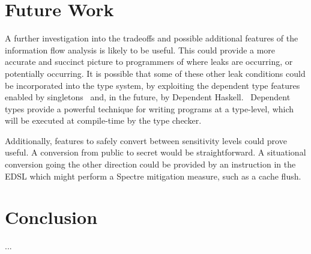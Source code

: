 \documentclass[10pt, conference]{IEEEtran}
\begin{document}

\section{Future Work}
A further investigation into the tradeoffs and possible additional features of
the information flow analysis is likely to be useful. This could provide a more
accurate and succinct picture to programmers of where leaks are occurring, or
potentially occurring. It is possible that some of these other leak conditions
could be incorporated into the type system, by exploiting the dependent type
features enabled by singletons~\cite{SingletonsPaper} and, in the future, by Dependent Haskell.~\cite{DepHaskSpec}
Dependent types provide a powerful technique for writing programs at a type-level, which
will be executed at compile-time by the type checker.~\cite{CertProg}

Additionally, features to safely convert between sensitivity levels could prove
useful. A conversion from public to secret would be straightforward. A situational conversion
going the other direction could be provided by an instruction in the EDSL
which might perform a Spectre mitigation measure, such as a cache flush. \cite{PLtea-james}

\section{Conclusion}
...



\end{document}
